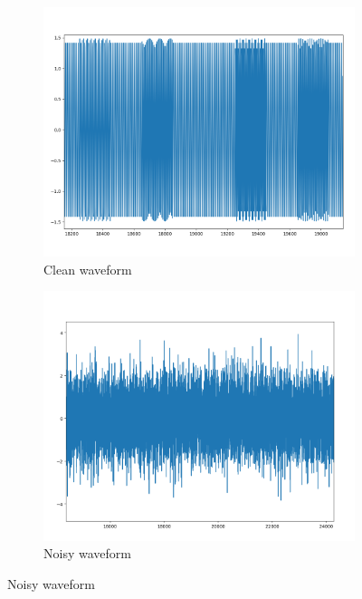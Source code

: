 \documentclass[a4paper]{article}
\begin{document}
\begin{figure}[H]
    \centering
    \begin{subfigure}[b]{0.45\textwidth}
        \includegraphics[width=\textwidth]{scope_clean.png}
        \caption{Clean waveform}
    \end{subfigure}
    \begin{subfigure}[b]{0.45\textwidth}
        \includegraphics[width=\textwidth]{scope_noisy.png}
        \caption{Noisy waveform}
    \end{subfigure}
\end{figure}
\end{document}

